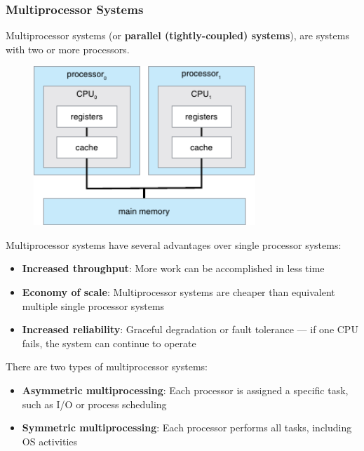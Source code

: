 \documentclass{article}
\begin{document}
\subsubsection{Multiprocessor Systems}
Multiprocessor systems (or \textbf{parallel (tightly-coupled) systems}),
are systems with two or more processors.
\begin{figure}[H]
    \centering
    \includegraphics[height = 6cm]{figures/multiprocessing.pdf}
\end{figure}
Multiprocessor systems have several advantages over
single processor systems:
\begin{itemize}
    \item \textbf{Increased throughput}: More work can be accomplished in less time
    \item \textbf{Economy of scale}: Multiprocessor systems are cheaper than equivalent multiple single processor systems
    \item \textbf{Increased reliability}: Graceful degradation or fault tolerance --- if one CPU fails, the system can continue to operate
\end{itemize}
There are two types of multiprocessor systems:
\begin{itemize}
    \item \textbf{Asymmetric multiprocessing}: Each processor is assigned a specific task, such as I/O or process scheduling
    \item \textbf{Symmetric multiprocessing}: Each processor performs all tasks, including OS activities
\end{itemize}
\end{document}
